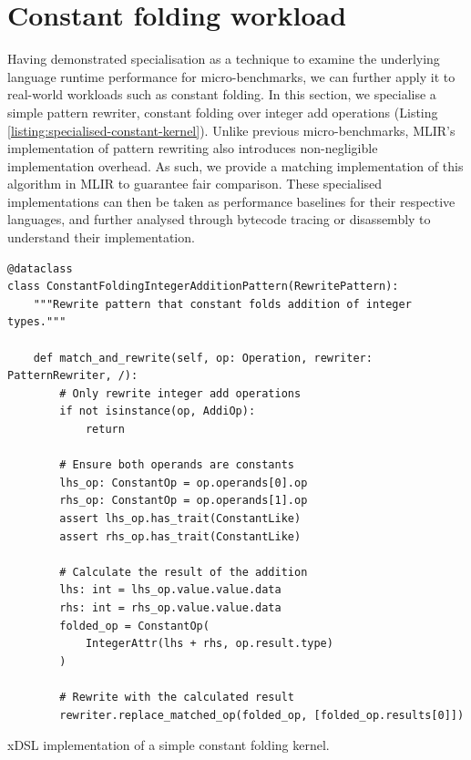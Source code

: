 \section{Constant folding workload}

Having demonstrated specialisation as a technique to examine the underlying language runtime performance for micro-benchmarks, we can further apply it to real-world workloads such as constant folding.
In this section, we specialise a simple pattern rewriter, constant folding over integer add operations (Listing \ref{listing:specialised-constant-kernel}). Unlike previous micro-benchmarks, MLIR's implementation of pattern rewriting also introduces non-negligible implementation overhead. As such, we provide a matching implementation of this algorithm in MLIR to guarantee fair comparison.
These specialised implementations can then be taken as performance baselines for their respective languages, and further analysed through bytecode tracing or disassembly to understand their implementation.

\vspace{2em}

\begin{code}
    \begin{verbatim}
@dataclass
class ConstantFoldingIntegerAdditionPattern(RewritePattern):
    """Rewrite pattern that constant folds addition of integer types."""
    
    def match_and_rewrite(self, op: Operation, rewriter: PatternRewriter, /):
        # Only rewrite integer add operations
        if not isinstance(op, AddiOp):
            return

        # Ensure both operands are constants
        lhs_op: ConstantOp = op.operands[0].op
        rhs_op: ConstantOp = op.operands[1].op
        assert lhs_op.has_trait(ConstantLike)
        assert rhs_op.has_trait(ConstantLike)

        # Calculate the result of the addition
        lhs: int = lhs_op.value.value.data
        rhs: int = rhs_op.value.value.data
        folded_op = ConstantOp(
            IntegerAttr(lhs + rhs, op.result.type)
        )

        # Rewrite with the calculated result
        rewriter.replace_matched_op(folded_op, [folded_op.results[0]])
    \end{verbatim}
    \caption{xDSL implementation of a simple constant folding kernel.}
    \label{listing:specialised-constant-kernel}
\end{code}


